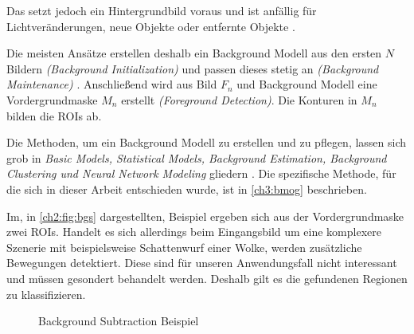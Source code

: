 Das setzt jedoch ein Hintergrundbild voraus und ist anfällig für Lichtveränderungen, neue Objekte oder entfernte Objekte \cite{maddalena_background_2012}.

Die meisten Ansätze erstellen deshalb ein Background Modell aus den ersten $N$ Bildern \textit{(Background Initialization)} und passen dieses stetig an \textit{(Background Maintenance)} \cite{maddalena_background_2012, yao_comparative_2017,sobral_comprehensive_2014}. 
Anschließend wird aus Bild $F_n$ und Background Modell eine Vordergrundmaske $M_n$ erstellt \textit{(Foreground Detection)}.
Die Konturen in $M_n$ bilden die \acp{ROI} ab.

Die Methoden, um ein Background Modell zu erstellen und zu pflegen, lassen sich grob in \textit{Basic Models, Statistical Models, Background Estimation, Background Clustering und Neural Network Modeling} gliedern \cite{goyal_review_2018}. 
Die spezifische Methode, für die sich in dieser Arbeit entschieden wurde, ist in \autoref{ch3:bmog} beschrieben.

\bigskip
Im, in \autoref{ch2:fig:bgs} dargestellten, Beispiel ergeben sich aus der Vordergrundmaske zwei \acp{ROI}.
Handelt es sich allerdings beim Eingangsbild um eine komplexere Szenerie mit beispielsweise Schattenwurf einer Wolke, werden zusätzliche Bewegungen detektiert.
Diese sind für unseren Anwendungsfall nicht interessant und müssen gesondert behandelt werden.
Deshalb gilt es die gefundenen Regionen zu klassifizieren.

\begin{figure}[ht]
    \centering
    \caption{Background Subtraction Beispiel}
    \label{ch2:fig:bgs}
\end{figure}

